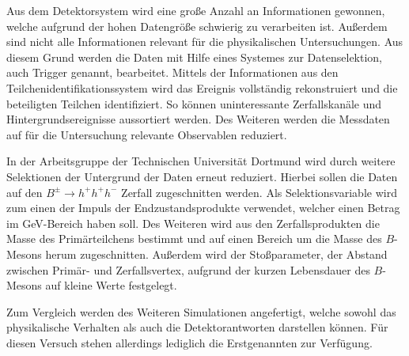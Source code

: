 Aus dem Detektorsystem wird eine große Anzahl an Informationen gewonnen, welche aufgrund der hohen Datengröße schwierig zu verarbeiten ist. Außerdem sind nicht alle Informationen relevant für die physikalischen Untersuchungen. Aus diesem Grund werden die Daten mit Hilfe eines Systemes zur Datenselektion, auch Trigger genannt, bearbeitet.
Mittels der Informationen aus den Teilchenidentifikationssystem wird das Ereignis vollständig rekonstruiert und die beteiligten Teilchen identifiziert. So können uninteressante Zerfallskanäle und Hintergrundsereignisse aussortiert werden. Des Weiteren werden die Messdaten auf für die Untersuchung relevante Observablen reduziert. 

In der Arbeitsgruppe der Technischen Universität Dortmund wird durch weitere Selektionen der Untergrund der Daten erneut reduziert. Hierbei sollen die Daten auf den $B^{\pm}\rightarrow h^{+}h^{+}h^{-} $ Zerfall zugeschnitten werden. Als Selektionsvariable wird zum einen der Impuls der Endzustandsprodukte verwendet, welcher einen Betrag im GeV-Bereich haben soll. Des Weiteren wird aus den Zerfallsprodukten die Masse des Primärteilchens bestimmt und auf einen Bereich um die Masse des $B$-Mesons herum zugeschnitten. Außerdem wird der Stoßparameter, der Abstand zwischen Primär- und Zerfallsvertex, aufgrund der kurzen Lebensdauer des $B$-Mesons auf kleine Werte festgelegt.

Zum Vergleich werden des Weiteren Simulationen angefertigt, welche sowohl das physikalische Verhalten als auch die Detektorantworten darstellen können. Für diesen Versuch stehen allerdings lediglich die Erstgenannten zur Verfügung. \cite{anleitung}
